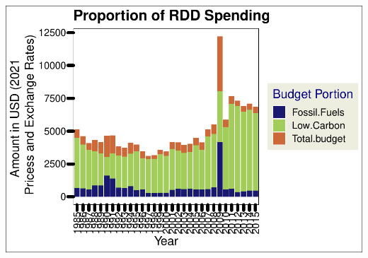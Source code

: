 \documentclass[
  12pt,
]{article}
\begin{document}
\includegraphics{Chang_Jenkins_Mullens_ENV872_Final_files/figure-latex/unnamed-chunk-1-1.pdf}
\end{document}
